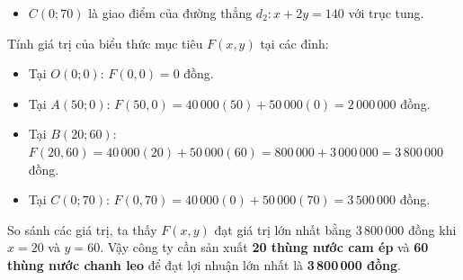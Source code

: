 \documentclass[12pt,a4paper]{article}
\begin{document}
\begin{itemize}[leftmargin=0.6cm, itemsep=4pt]
\begin{itemize}
    \item $C(0; 70)$ là giao điểm của đường thẳng $d_2: x + 2y = 140$ với trục tung.
\end{itemize}
Tính giá trị của biểu thức mục tiêu $F(x, y)$ tại các đỉnh:
\begin{itemize}
    \item Tại $O(0; 0)$: $F(0, 0) = 0$ đồng.
    \item Tại $A(50; 0)$: $F(50, 0) = 40\,000(50) + 50\,000(0) = 2\,000\,000$ đồng.
    \item Tại $B(20; 60)$: $F(20, 60) = 40\,000(20) + 50\,000(60) = 800\,000 + 3\,000\,000 = 3\,800\,000$ đồng.
    \item Tại $C(0; 70)$: $F(0, 70) = 40\,000(0) + 50\,000(70) = 3\,500\,000$ đồng.
\end{itemize}
So sánh các giá trị, ta thấy $F(x, y)$ đạt giá trị lớn nhất bằng $3\,800\,000$ đồng khi $x = 20$ và $y = 60$.
Vậy công ty cần sản xuất \textbf{20 thùng nước cam ép} và \textbf{60 thùng nước chanh leo} để đạt lợi nhuận lớn nhất là \textbf{3\,800\,000 đồng}.
\end{itemize}
\end{document}

